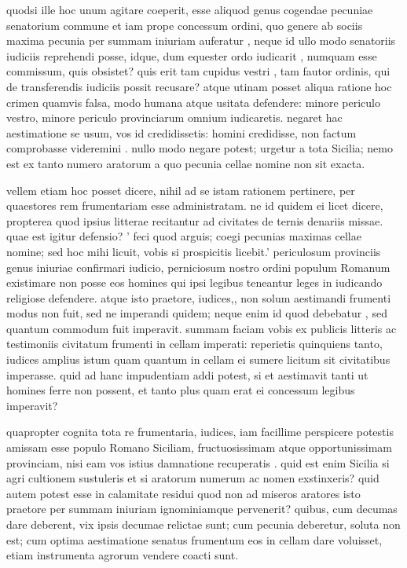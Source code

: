  quodsi ille hoc unum agitare coeperit, esse aliquod genus cogendae pecuniae senatorium commune et iam prope concessum ordini, quo genere ab sociis maxima pecunia per summam iniuriam auferatur , neque id ullo modo senatoriis iudiciis reprehendi posse, idque, dum equester ordo iudicarit , numquam esse commissum, quis obsistet? quis erit tam cupidus vestri , tam fautor ordinis, qui de transferendis iudiciis possit recusare? atque utinam posset aliqua ratione hoc crimen quamvis falsa, modo humana atque usitata defendere: minore periculo vestro, minore periculo provinciarum omnium iudicaretis. negaret hac aestimatione se usum, vos id credidissetis: homini credidisse, non factum comprobasse videremini . nullo modo negare potest; urgetur a tota Sicilia; nemo est ex tanto numero aratorum a quo pecunia cellae nomine non sit exacta.

 vellem etiam hoc posset dicere, nihil ad se istam rationem pertinere, per quaestores rem frumentariam esse administratam. ne id quidem ei licet dicere, propterea quod ipsius litterae recitantur ad civitates de ternis denariis missae. quae est igitur defensio? ' feci quod arguis; coegi pecunias maximas cellae nomine; sed hoc mihi licuit, vobis si prospicitis licebit.' periculosum provinciis genus iniuriae confirmari iudicio, perniciosum nostro ordini populum Romanum existimare non posse eos homines qui ipsi legibus teneantur leges in iudicando religiose defendere. atque isto praetore, iudices,, non solum aestimandi frumenti modus non fuit, sed ne imperandi quidem; neque enim id quod debebatur , sed quantum commodum fuit imperavit. summam faciam vobis ex publicis litteris ac testimoniis civitatum frumenti in cellam imperati: reperietis quinquiens tanto, iudices amplius istum quam quantum in cellam ei sumere licitum sit civitatibus imperasse. quid ad hanc impudentiam addi potest, si et aestimavit tanti ut homines ferre non possent, et tanto plus quam erat ei concessum legibus imperavit?

 quapropter cognita tota re frumentaria, iudices, iam facillime perspicere potestis amissam esse populo Romano Siciliam, fructuosissimam atque opportunissimam provinciam, nisi eam vos istius damnatione recuperatis . quid est enim Sicilia si agri cultionem sustuleris et si aratorum numerum ac nomen exstinxeris? quid autem potest esse in calamitate residui quod non ad miseros aratores isto praetore per summam iniuriam ignominiamque pervenerit? quibus, cum decumas dare deberent, vix ipsis decumae relictae sunt; cum pecunia deberetur, soluta non est; cum optima aestimatione senatus frumentum eos in cellam dare voluisset, etiam instrumenta agrorum vendere coacti sunt.

